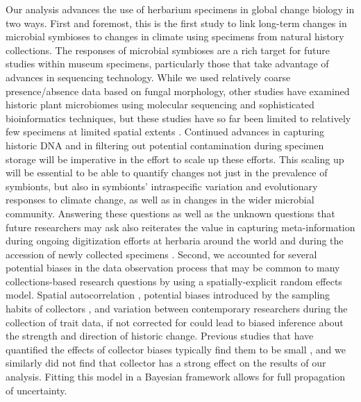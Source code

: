 \documentclass[11pt]{article}
\let\cite\citep
\begin{document}
Our analysis advances the use of herbarium specimens in global change biology in two ways. 
First and foremost, this is the first study to link long-term changes in microbial symbioses to changes in climate using specimens from natural history collections.
The responses of microbial symbioses are a rich target for future studies within museum specimens, particularly those that take advantage of advances in sequencing technology.
While we used relatively coarse presence/absence data based on fungal morphology, other studies have examined historic plant microbiomes using molecular sequencing and sophisticated bioinformatics techniques, but these studies have so far been limited to relatively few specimens at limited spatial extents \cite{yoshida2015computational, heberling2019utilizing, bieker2020metagenomic, gross2021hidden, bradshaw2021global}. 
Continued advances in capturing historic DNA and in filtering out potential contamination during specimen storage \citep{daru2019novel, bakker2020herbarium, raxworthy2021mining} will be imperative in the effort to scale up these efforts. 
This scaling up will be essential to be able to quantify changes not just in the prevalence of symbionts, but also in symbionts' intraspecific variation and evolutionary responses to climate change, as well as  in changes in the wider microbial community. 
Answering these questions as well as the unknown questions that future researchers may ask also reiterates the value in capturing meta-information during ongoing digitization efforts at herbaria around the world and during the accession of newly collected specimens \citep{lendemer2020extended}.
Second, we accounted for several potential biases in the data observation process that may be common to many collections-based research questions by using a spatially-explicit random effects model. 
Spatial autocorrelation \cite{willems2022forest}, potential biases introduced by the sampling habits of collectors \citep{daru2018widespread}, and variation between contemporary researchers during the collection of trait data, if not corrected for could lead to biased inference about the strength and direction of historic change.
Previous studies that have quantified the effects of collector biases typically find them to be small  \cite{davis2015herbarium,meineke2019herbarium}, and we similarly did not find that collector has a strong effect on the results of our analysis.
Fitting this model in a Bayesian framework allows for full propagation of uncertainty.
\end{document}
